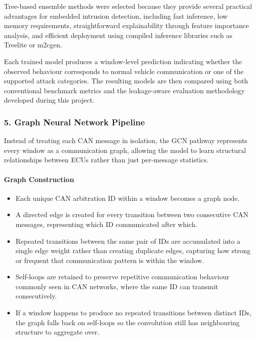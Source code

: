 \documentclass{article}
\begin{document}
Tree-based ensemble methods were selected because they provide several practical advantages for embedded intrusion detection, including fast inference, low memory requirements, straightforward explainability through feature importance analysis, and efficient deployment using compiled inference libraries such as Treelite or m2cgen.

Each trained model produces a window-level prediction indicating whether the observed behaviour corresponds to normal vehicle communication or one of the supported attack categories. The resulting models are then compared using both conventional benchmark metrics and the leakage-aware evaluation methodology developed during this project.

\subsubsection{5. Graph Neural Network Pipeline}
Instead of treating each CAN message in isolation, the GCN pathway represents every window as a communication graph, allowing the model to learn structural relationships between ECUs rather than just per-message statistics.

\paragraph{Graph Construction}
\begin{itemize}[noitemsep]
    \item Each unique CAN arbitration ID within a window becomes a graph node.
    \item A directed edge is created for every transition between two consecutive CAN messages, representing which ID communicated after which.
    \item Repeated transitions between the same pair of IDs are accumulated into a single edge weight rather than creating duplicate edges, capturing how strong or frequent that communication pattern is within the window.
    \item Self-loops are retained to preserve repetitive communication behaviour commonly seen in CAN networks, where the same ID can transmit consecutively.
    \item If a window happens to produce no repeated transitions between distinct IDs, the graph falls back on self-loops so the convolution still has neighbouring structure to aggregate over.
\end{itemize}
\end{document}
